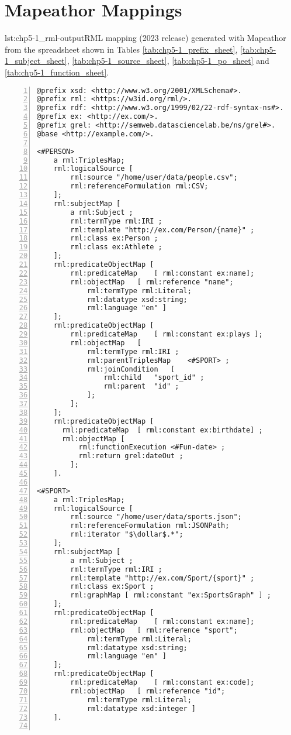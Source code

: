 \section{Mapeathor Mappings}
\label{sec:appendix-mapeathor}

\begin{captionedlisting}{lst:chp5-1_rml-output}{RML mapping (2023 release) generated with Mapeathor from the spreadsheet shown in Tables \ref{tab:chp5-1_prefix_sheet}, \ref{tab:chp5-1_subject_sheet}, \ref{tab:chp5-1_source_sheet}, \ref{tab:chp5-1_po_sheet} and \ref{tab:chp5-1_function_sheet}. }
\centering
{\begin{lstlisting}[numbers=left,basicstyle=\ttfamily\small,columns=flexible]
@prefix xsd: <http://www.w3.org/2001/XMLSchema#>.
@prefix rml: <https://w3id.org/rml/>.
@prefix rdf: <http://www.w3.org/1999/02/22-rdf-syntax-ns#>.
@prefix ex: <http://ex.com/>.
@prefix grel: <http://semweb.datasciencelab.be/ns/grel#>.
@base <http://example.com/>.

<#PERSON>
    a rml:TriplesMap;
    rml:logicalSource [
    	rml:source "/home/user/data/people.csv";
    	rml:referenceFormulation rml:CSV;
    ];
    rml:subjectMap [
    	a rml:Subject ;
    	rml:termType rml:IRI ;
    	rml:template "http://ex.com/Person/{name}" ;
    	rml:class ex:Person ;
    	rml:class ex:Athlete ;
    ];
    rml:predicateObjectMap [
    	rml:predicateMap	[ rml:constant ex:name];
    	rml:objectMap	[ rml:reference "name";
    		rml:termType rml:Literal;
    		rml:datatype xsd:string;
    		rml:language "en" ]
    ];
    rml:predicateObjectMap [
    	rml:predicateMap	[ rml:constant ex:plays ];
    	rml:objectMap	[
    		rml:termType rml:IRI ;
    		rml:parentTriplesMap	<#SPORT> ;
    		rml:joinCondition	[
    			rml:child	"sport_id" ;
    			rml:parent	"id" ;
    		];
    	];
    ];
    rml:predicateObjectMap [
      rml:predicateMap	[ rml:constant ex:birthdate] ;
      rml:objectMap	[
    	  rml:functionExecution <#Fun-date> ;
    	  rml:return grel:dateOut ;
    	];
    ].

<#SPORT>
    a rml:TriplesMap;
    rml:logicalSource [
    	rml:source "/home/user/data/sports.json";
    	rml:referenceFormulation rml:JSONPath;
        rml:iterator "$\dollar$.*";
    ];
    rml:subjectMap [
    	a rml:Subject ;
    	rml:termType rml:IRI ;
    	rml:template "http://ex.com/Sport/{sport}" ;
    	rml:class ex:Sport ;
    	rml:graphMap [ rml:constant "ex:SportsGraph" ] ;
    ];
    rml:predicateObjectMap [
    	rml:predicateMap	[ rml:constant ex:name];
    	rml:objectMap	[ rml:reference "sport";
    		rml:termType rml:Literal;
    		rml:datatype xsd:string;
    		rml:language "en" ]
    ];
    rml:predicateObjectMap [
    	rml:predicateMap	[ rml:constant ex:code];
    	rml:objectMap	[ rml:reference "id";
    		rml:termType rml:Literal;
    		rml:datatype xsd:integer ]
    ].


\end{lstlisting}}
\end{captionedlisting}
